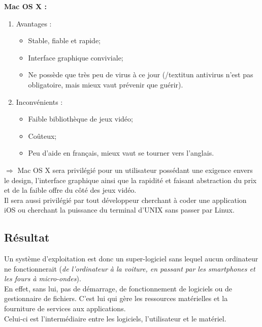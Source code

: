 \clearpage

\textbf{Mac OS X :}

\begin{enumerate}
\item Avantages : \\

  \begin{itemize}
  \item Stable, fiable et rapide; \\

  \item Interface graphique conviviale; \\

  \item Ne possède que très peu de virus à ce jour (/textit{un antivirus n'est
  pas obligatoire, mais mieux vaut prévenir que guérir}).\\
  \end{itemize}

\item Inconvénients : \\

  \begin{itemize}
  \item Faible bibliothèque de jeux vidéo; \\

  \item Coûteux; \\

  \item Peu d'aide en français, mieux vaut se tourner vers l'anglais. \\
  \end{itemize}
\end{enumerate}

$\Rightarrow$ Mac OS X sera privilégié pour un utilisateur possédant une
exigence envers le design, l'interface graphique ainsi que la rapidité et
faisant abstraction du prix et de la faible offre du côté des jeux vidéo. \\
Il sera aussi privilégié par tout développeur cherchant à coder une application
iOS ou cherchant la puissance du terminal d'UNIX sans passer par Linux.

\newpage

\subsection{Résultat}
Un système d'exploitation est donc un super-logiciel sans lequel aucun ordinateur
ne fonctionnerait (\textit{de l'ordinateur à la voiture, en passant par les smartphones
et les fours à micro-ondes}). \\
En effet, sans lui, pas de démarrage, de fonctionnement de logiciels ou de
gestionnaire de fichiers. C'est lui qui gère les ressources matérielles et la
fourniture de services aux applications. \\
Celui-ci est l’intermédiaire entre les logiciels, l’utilisateur et le matériel. \\

